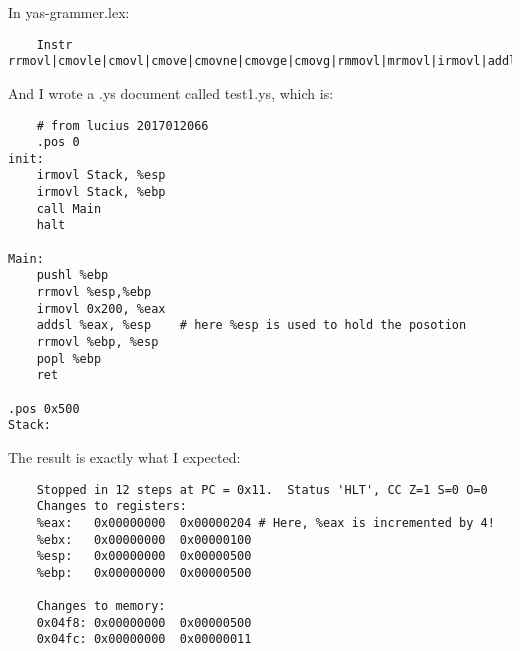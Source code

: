 \documentclass{article}
\begin{document}
In yas-grammer.lex:
\begin{lstlisting}
	Instr         rrmovl|cmovle|cmovl|cmove|cmovne|cmovge|cmovg|rmmovl|mrmovl|irmovl|addl|subl|andl|xorl|jmp|jle|jl|je|jne|jge|jg|call|ret|pushl|popl|"."byte|"."word|"."long|"."pos|"."align|halt|nop|iaddl|leave|addsl
\end{lstlisting}

And I wrote a .ys document called test1.ys, which is:
\begin{lstlisting}
	# from lucius 2017012066
	.pos 0
init:
	irmovl Stack, %esp
	irmovl Stack, %ebp
	call Main
	halt

Main:
	pushl %ebp
	rrmovl %esp,%ebp
	irmovl 0x200, %eax
	addsl %eax, %esp    # here %esp is used to hold the posotion
	rrmovl %ebp, %esp
	popl %ebp
	ret

.pos 0x500
Stack:
\end{lstlisting}

The result is exactly what I expected:
\begin{lstlisting}
	Stopped in 12 steps at PC = 0x11.  Status 'HLT', CC Z=1 S=0 O=0
	Changes to registers:
	%eax:	0x00000000	0x00000204 # Here, %eax is incremented by 4!
	%ebx:	0x00000000	0x00000100
	%esp:	0x00000000	0x00000500
	%ebp:	0x00000000	0x00000500
	
	Changes to memory:
	0x04f8:	0x00000000	0x00000500
	0x04fc:	0x00000000	0x00000011
	
\end{lstlisting}
\end{document}
